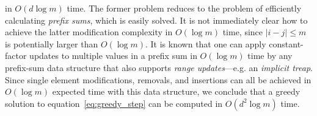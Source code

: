 \documentclass{siamart190516}
\begin{document}
in $O(d\log m)$ time. 
The former problem reduces to the problem of efficiently calculating \emph{prefix sums}, which is easily solved. 
It is not immediately clear how to achieve the latter modification complexity in $O(\log m)$ time, since $\lvert i - j \rvert \leq m$ is potentially larger than $O(\log m)$. %
It is known that one can apply constant-factor updates to multiple values in a prefix sum in $O(\log m)$ time by any prefix-sum data structure that also supports \emph{range updates}---e.g. an \emph{implicit treap}. 
Since single element modifications, removals, and insertions can all be achieved in $O(\log m)$ expected time with this data structure, we conclude that a greedy solution to equation~\ref{eq:greedy_step} can be computed in $O(d^2 \log m)$ time. 

\end{document}
